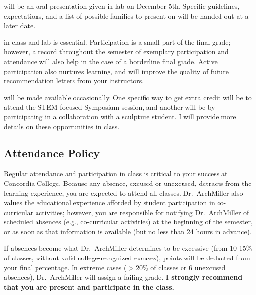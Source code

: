 \documentclass{tufte-handout}
\begin{document}
\begin{fullwidth}
 will be an oral presentation given in lab on December 5th. Specific guidelines, expectations, and a list of possible families to present on will be handed out at a later date.


 in class and lab is essential. Participation is a small part of the final grade; however, a record throughout the semester of exemplary participation and attendance will also help in the case of a borderline final grade. Active participation also nurtures learning, and will improve the quality of future recommendation letters from your instructors.  

 will be made available occasionally. One specific way to get extra credit will be to attend the STEM-focused Symposium session, and another will be by participating in a collaboration with a sculpture student. I will provide more details on these opportunities in class.

\subsection{Attendance Policy}

Regular attendance and participation in class is critical to your success at Concordia College. Because any absence, excused or unexcused, detracts from the learning experience, you are expected to attend all classes. Dr.~ArchMiller also values the educational experience afforded by student participation in co-curricular activities; however, you are responsible for notifying Dr.~ArchMiller of scheduled absences (e.g., co-curricular activities) at the beginning of the semester, or as soon as that information is available (but no less than 24 hours in advance). 

If absences become what Dr.~ArchMiller determines to be excessive (from 10-15\% of classes, without valid college-recognized excuses), points will be deducted from your final percentage. In extreme cases ($>20$\% of classes or 6 unexcused absences), Dr.~ArchMiller will assign a failing grade. \textbf{I strongly recommend that you are present and participate in the class.}









\end{fullwidth}
\end{document}

